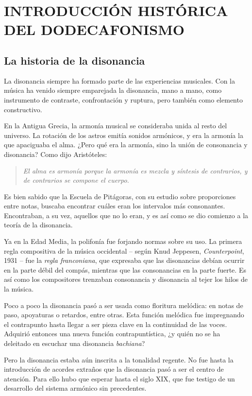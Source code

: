 \section{INTRODUCCIÓN HISTÓRICA DEL DODECAFONISMO}\label{ch:historia}

\subsection{La historia de la disonancia}
La disonancia siempre ha formado parte de las experiencias musicales. Con la música ha venido siempre emparejada la disonancia, mano a mano, como instrumento de contraste, confrontación y ruptura, pero también como elemento constructivo.

En la Antigua Grecia, la armonía musical se consideraba unida al resto del universo. La rotación de los astros emitía sonidos armónicos, y era la armonía la que apaciguaba el alma. ¿Pero qué era la armonía, sino la unión de consonancia y disonancia? Como dijo Aristóteles:
\begin{quote}
\emph{El alma es armonía porque la armonía es mezcla y síntesis de contrarios, y de contrarios se compone el cuerpo.}\\
\end{quote}

Es bien sabido que la Escuela de Pitágoras, con su estudio sobre proporciones entre notas, buscaba encontrar cuáles eran los intervalos más consonantes. Encontraban, a su vez, aquellos que no lo eran, y es así como se dio comienzo a la teoría de la disonancia. 

Ya en la Edad Media, la polifonía fue forjando normas sobre su uso. La primera regla compositiva de la música occidental -- según {Knud Jeppesen, \textit{Counterpoint}, 1931} -- fue la \emph{regla franconiana}, que expresaba que las disonancias debían ocurrir en la parte débil del compás, mientras que las consonancias en la parte fuerte. Es así como los compositores trenzaban consonancia y disonancia al tejer los hilos de la música.

Poco a poco la disonancia pasó a ser usada como floritura melódica: en notas de paso, apoyaturas o retardos, entre otras. Esta función melódica fue impregnando el contrapunto hasta llegar a ser pieza clave en la continuidad de las voces. Adquirió entonces una nueva función contrapuntística, ¿y quién no se ha deleitado en escuchar una disonancia \textit{bachiana}?

Pero la disonancia estaba aún inscrita a la tonalidad regente. No fue hasta la introducción de acordes extraños que la disonancia pasó a ser el centro de atención. Para ello hubo que esperar hasta el siglo XIX, que fue testigo de un desarrollo del sistema armónico sin precedentes. 
%
\cite{aguirre}

